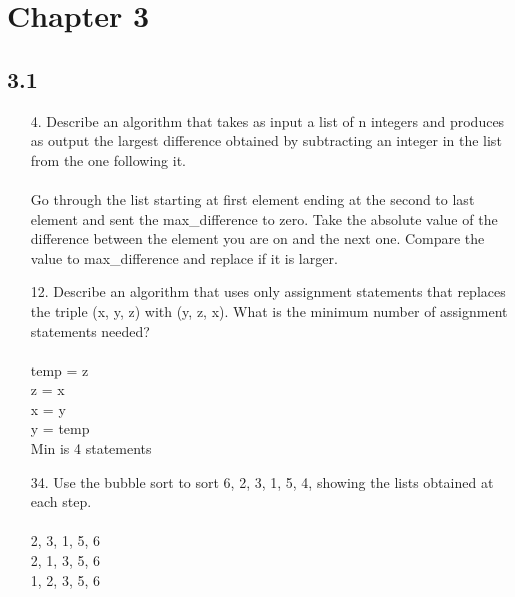 \section{Chapter 3}
\subsection{3.1}
\begin{itemize}
    \item[4.] Describe an algorithm that takes as input a list of n integers and produces as output the largest difference obtained by subtracting an integer in the list from the one following it.\\
          \answer \\
          Go through the list starting at first element ending at the second to last element and sent the max\_difference to zero. Take the absolute value of the difference between the element you are on and the next one. Compare the value to max\_difference and replace if it is larger.

    \item[12.] Describe an algorithm that uses only assignment statements that replaces the triple (x, y, z) with (y, z, x). What is the minimum number of assignment statements needed?\\
          \answer \\
          temp = z \\
          z = x \\
          x = y\\
          y = temp \vspace{3mm}\\
          Min is 4  statements

    \item[34.] Use the bubble sort to sort 6, 2, 3, 1, 5, 4, showing the lists obtained at each step.\\
          \answer \\
          2, 3, 1, 5, 6 \\
          2, 1, 3, 5, 6\\
          1, 2, 3, 5, 6\\
\end{itemize}

